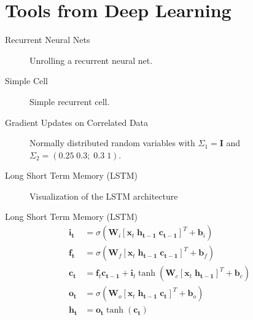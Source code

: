 \documentclass{beamer}
\begin{document}
\section{Tools from Deep Learning}

\begin{frame}{Recurrent Neural Nets}
\begin{figure}
	
	\caption{Unrolling a recurrent neural net.}
\end{figure}
\end{frame}

\begin{frame}{Simple Cell}
	\begin{figure}
		
		\caption{Simple recurrent cell.}
	\end{figure}
\end{frame}


\begin{frame}{Gradient Updates on Correlated Data}
	\begin{figure}
		
		
		\caption{Normally distributed random variables with $
		\Sigma_1 = \mathbf{I}$ and $\Sigma_2 = (0.25 \; 0.3; \; 0.3 \; 1)$. }
	\end{figure}
\end{frame}


\begin{frame}{Long Short Term Memory (LSTM)}
	\begin{figure}
		
		\caption{Visualization of the LSTM architecture}
		\label{fig:lstm}
	\end{figure}
\end{frame}

\begin{frame}{Long Short Term Memory (LSTM)}
	\begin{align}
	\mathbf{i_t} &= \sigma (\mathbf{W}_i [\mathbf{x}_t \; \mathbf{h_{t-1}} \; \mathbf{c_{t-1}}]^T + \mathbf{b}_i) \\
	\mathbf{f_t} &= \sigma (\mathbf{W}_f [\mathbf{x}_t \; \mathbf{h_{t-1}} \; \mathbf{c_{t-1}}]^T + \mathbf{b}_f) \\
	\mathbf{c_t} &= \mathbf{f}_t \mathbf{c_{t-1}} + \mathbf{i}_t \tanh( \mathbf{W}_c [\mathbf{x}_t \; \mathbf{h_{t-1}}]^T + \mathbf{b}_c ) \\
	\mathbf{o_t} &= \sigma (\mathbf{W}_o [\mathbf{x}_t \; \mathbf{h_{t-1}} \; \mathbf{c_t}]^T + \mathbf{b}_o ) \\
	\mathbf{h_t} &= \mathbf{o_t} \tanh(\mathbf{c_t})
	\end{align}
\end{frame}
\end{document}
